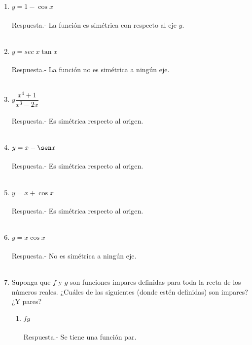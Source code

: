 \begin{enumerate}
\item $y=1- \cos x$\\\\
    Respuesta.-\; La función es simétrica con respecto al eje $y$.\\\\

\item $y=sec \; x \tan x$\\\\
    Respuesta.-\; La función no es simétrica a ningún eje.\\\\

\item $y\dfrac{x^4 + 1}{x^3 - 2x}$\\\\
    Respuesta.-\; Es simétrica respecto al origen.\\\\ 

\item $y =  x - \sen x$\\\\
    Respuesta.-\; Es simétrica respecto al origen.\\\\

\item $y = x + \cos x$\\\\
    Respuesta.-\; Es simétrica respecto al origen.\\\\

\item $y=x \cos x$\\\\
    Respuesta.-\; No es simétrica a ningún eje.\\\\

\item Suponga que $f$ y $g$ son funciones impares definidas para toda la recta de los números reales. ¿Cuáles de las siguientes (donde estén definidas) son impares? ¿Y pares?
\begin{enumerate}[\bfseries a)]

    \item $fg$\\\\
	Respuesta.-\; Se tiene una función par.\\\\


\end{enumerate}
\end{enumerate}
